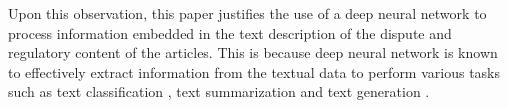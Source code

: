 
Upon this observation, this paper justifies the use of a deep neural network to process information embedded in the text description of the dispute and regulatory content of the articles. 
This is because deep neural network is known to effectively
extract information from the textual data to perform various tasks such as text classification \citep{minaee2020deep}, text summarization \citep{textsum} and text generation \citep{guo2017long}.
 
 
 

